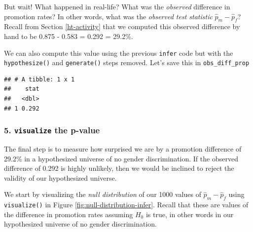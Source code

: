 \documentclass[
]{book}
\newenvironment{Shaded}{\begin{snugshade}}{\end{snugshade}}
\newcommand{\DataTypeTok}[1]{\textcolor[rgb]{0.13,0.29,0.53}{#1}}
\newcommand{\KeywordTok}[1]{\textcolor[rgb]{0.13,0.29,0.53}{\textbf{#1}}}
\newcommand{\NormalTok}[1]{#1}
\newcommand{\OperatorTok}[1]{\textcolor[rgb]{0.81,0.36,0.00}{\textbf{#1}}}
\newcommand{\StringTok}[1]{\textcolor[rgb]{0.31,0.60,0.02}{#1}}
\begin{document}
But wait! What happened in real-life? What was the \emph{observed} difference in promotion rates? In other words, what was the \emph{observed test statistic} \(\widehat{p}_{m} - \widehat{p}_{f}\)? Recall from Section \ref{ht-activity} that we computed this observed difference by hand to be 0.875 - 0.583 = 0.292 = 29.2\%.

We can also compute this value using the previous \texttt{infer} code but with the \texttt{hypothesize()} and \texttt{generate()} steps removed. Let's save this in \texttt{obs\_diff\_prop}

\begin{Shaded}
\end{Shaded}

\begin{verbatim}
## # A tibble: 1 x 1
##    stat
##   <dbl>
## 1 0.292
\end{verbatim}

\hypertarget{visualize-the-p-value}{%
\subsubsection*{\texorpdfstring{5. \texttt{visualize} the p-value}{5. visualize the p-value}}\label{visualize-the-p-value}}

The final step is to measure how surprised we are by a promotion difference of 29.2\% in a hypothesized universe of no gender discrimination. If the observed difference of 0.292 is highly unlikely, then we would be inclined to reject the validity of our hypothesized universe.

We start by visualizing the \emph{null distribution} of our 1000 values of \(\widehat{p}_{m} - \widehat{p}_{f}\) using \texttt{visualize()}  in Figure \ref{fig:null-distribution-infer}. Recall that these are values of the difference in promotion rates assuming \(H_0\) is true, in other words in our hypothesized universe of no gender discrimination.
\end{document}
